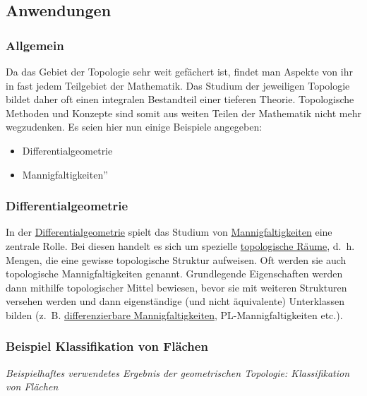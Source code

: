 \documentclass[12pt,]{article}
\providecommand{\tightlist}{%
  \setlength{\itemsep}{0pt}\setlength{\parskip}{0pt}}
\begin{document}
\subsection{Anwendungen}\label{anwendungen}

\subsubsection{Allgemein}\label{allgemein}

Da das Gebiet der Topologie sehr weit gefächert ist, findet man Aspekte
von ihr in fast jedem Teilgebiet der Mathematik. Das Studium der
jeweiligen Topologie bildet daher oft einen integralen Bestandteil einer
tieferen Theorie. Topologische Methoden und Konzepte sind somit aus
weiten Teilen der Mathematik nicht mehr wegzudenken. Es seien hier nun
einige Beispiele angegeben:

\begin{itemize}
\tightlist
\item
  Differentialgeometrie
\item
  Mannigfaltigkeiten''
\end{itemize}

\subsubsection{Differentialgeometrie}\label{differentialgeometrie}

In der \url{Differentialgeometrie} spielt das Studium von
\href{Mannigfaltigkeit}{Mannigfaltigkeiten} eine zentrale Rolle. Bei
diesen handelt es sich um spezielle
\href{Topologischer_Raum}{topologische Räume}, d.~h. Mengen, die eine
gewisse topologische Struktur aufweisen. Oft werden sie auch
topologische Mannigfaltigkeiten genannt. Grundlegende Eigenschaften
werden dann mithilfe topologischer Mittel bewiesen, bevor sie mit
weiteren Strukturen versehen werden und dann eigenständige (und nicht
äquivalente) Unterklassen bilden (z.~B.
\href{differenzierbare_Mannigfaltigkeit}{differenzierbare
Mannigfaltigkeiten}, PL-Mannigfaltigkeiten etc.).

\subsubsection{Beispiel Klassifikation von
Flächen}\label{beispiel-klassifikation-von-fluxe4chen}

\emph{Beispielhaftes verwendetes Ergebnis der geometrischen Topologie:
Klassifikation von Flächen}
\end{document}
